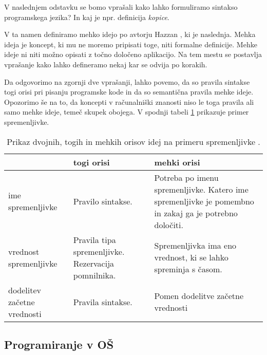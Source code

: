 V naslednjem odstavku se bomo vprašali kako lahko formuliramo sintakso
programskega jezika? In kaj je npr. definicija \emph{kopice}.

V ta namen definiramo mehko idejo po avtorju Hazzan \cite{guideTCS},
ki je naslednja. Mehka ideja je koncept, ki mu ne moremo pripisati
toge, niti formalne definicije. Mehke ideje ni niti možno opisati z
točno določeno aplikacijo. Na tem mestu se postavlja vprašanje kako
lahko defineramo nekaj kar se odvija po korakih.

Da odgovorimo na zgornji dve vprašanji, lahko povemo, da so pravila
sintakse togi orisi pri pisanju programske kode in da so semantična
pravila mehke ideje. Opozorimo še na to, da koncepti v računalniški
znanosti niso le toga pravila ali samo mehke ideje, temeč skupek
obojega. V spodnji tabeli \ref{tab:koncept_spremenljivka} prikazuje
primer spremenljivke.


\begin{table}[!htb]

\caption{Prikaz dvojnih, togih in mehkih orisov idej na primeru
  spremenljivke \cite{guideTCS}. }
\label{tab:koncept_spremenljivka}
\begin{tabular}{
  | p{} |
  p{} |
  p{} | }
  \hline
  \rowcolor{gray!50}
  & \textbf{togi orisi} & \textbf{mehki orisi}\\
  \hline
  ime spremenljivke & Pravilo sintakse. & Potreba po imenu
                                          spremenljivke. Katero ime
                                          spremenljivke je pomembno in
                                          zakaj ga je potrebno
                                          določiti.\\
  \hline
  vrednost spremenljivke & Pravila tipa spremenljivke. Rezervacija
                           pomnilnika. & Spremenljivka ima eno
                                         vrednost, ki se lahko
                                         spreminja s časom.\\
  \hline
  dodelitev začetne vrednosti & Pravila sintakse. & Pomen dodelitve
                                                  začetne vrednosti\\
  \hline

\end{tabular}
\end{table}

\subsection{Programiranje v OŠ}
\label{sec:Programiranje_v_OŠ}

